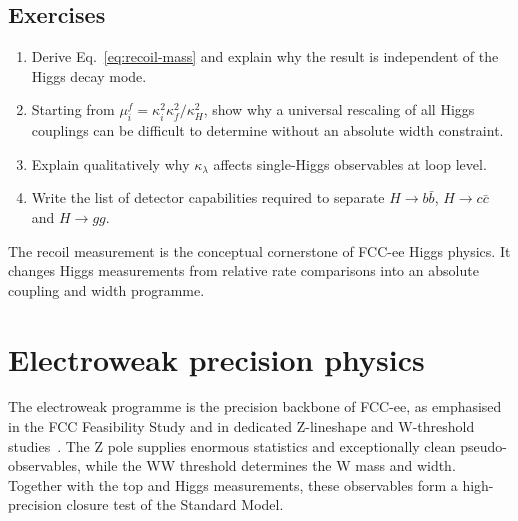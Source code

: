 \documentclass[11pt,a4paper]{article}
\numberwithin{equation}{section}
\begin{document}
\subsection{Exercises}
\begin{enumerate}[leftmargin=1.6em]
\item Derive Eq.~\eqref{eq:recoil-mass} and explain why the result is independent of the Higgs decay mode.
\item Starting from \(\mu_i^f=\kappa_i^2\kappa_f^2/\kappa_H^2\), show why a universal rescaling of all Higgs couplings can be difficult to determine without an absolute width constraint.
\item Explain qualitatively why \(\kappa_\lambda\) affects single-Higgs observables at loop level.
\item Write the list of detector capabilities required to separate \(H\to b\bar b\), \(H\to c\bar c\) and \(H\to gg\).
\end{enumerate}

\begin{takehomebox}
The recoil measurement is the conceptual cornerstone of FCC-ee Higgs physics. It changes Higgs measurements from relative rate comparisons into an absolute coupling and width programme.
\end{takehomebox}


\newpage
\section{Electroweak precision physics}
\begin{guidelinebox}
The electroweak programme is the precision backbone of FCC-ee, as emphasised in the FCC Feasibility Study and in dedicated Z-lineshape and W-threshold studies~\cite{FCCFSRVol1,ZLineshape2021,WMassWidth2021}. The Z pole supplies enormous statistics and exceptionally clean pseudo-observables, while the WW threshold determines the W mass and width. Together with the top and Higgs measurements, these observables form a high-precision closure test of the Standard Model.
\end{guidelinebox}
\end{document}
